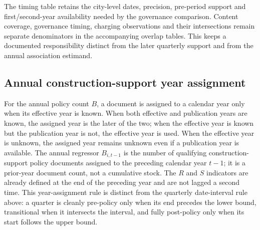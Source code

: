 The timing table retains the city-level dates, precision, pre-period support and
first/second-year availability needed by the governance comparison.  Content
coverage, governance timing, charging observations and their intersections
remain separate denominators in the accompanying overlap tables.  This keeps a
documented responsibility distinct from the later quarterly support and from
the annual association estimand.

\subsection{Annual construction-support year assignment}
For the annual policy count $B$, a document is assigned to a calendar year only
when its effective year is known.  When both effective and publication years are
known, the assigned year is the later of the two; when the effective year is
known but the publication year is not, the effective year is used.  When the
effective year is unknown, the assigned year remains unknown even if a
publication year is available.  The annual regressor $B_{i,t-1}$ is the number
of qualifying construction-support policy documents assigned to the preceding
calendar year $t-1$; it is a prior-year document count, not a cumulative stock.
The $R$ and $S$ indicators are already defined at the end of the preceding year
and are not lagged a second time.  This year-assignment rule is distinct from
the quarterly date-interval rule above: a quarter is cleanly pre-policy only
when its end precedes the lower bound, transitional when it intersects the
interval, and fully post-policy only when its start follows the upper bound.
